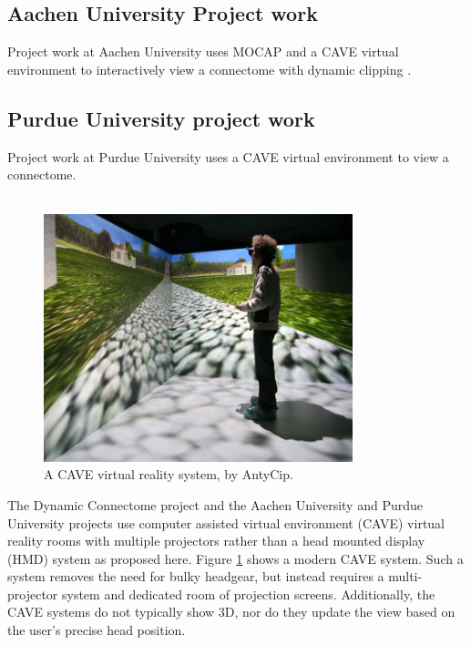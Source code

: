 \documentclass[MSc,paper=a4,pagesize=auto]{icldt}
\begin{document}
\subsection{Aachen University Project work} 
Project work at Aachen University \cite{Rick2011} uses MOCAP and a CAVE virtual environment to interactively view a connectome with dynamic clipping \cite{ceeds2014}.

\subsection{Purdue University project work}
Project work at Purdue University \cite{Chen2011} uses a CAVE virtual environment to view a connectome.
\\
\\
\begin{figure}[htbp!]
    \centering
    \includegraphics[width=0.8\textwidth]{resources/yview_cave}
    \caption{A CAVE virtual reality system, by AntyCip.}
    \label{fig:yview_cave}
\end{figure}

The Dynamic Connectome project and the Aachen University and Purdue University projects use computer assisted virtual environment (CAVE) virtual reality rooms with multiple projectors rather than a head mounted display (HMD) system as proposed here. Figure \ref{fig:yview_cave}	
shows a modern CAVE system. Such a system removes the need for bulky headgear, but instead requires a multi-projector system and dedicated room of projection screens. Additionally, the CAVE systems do not typically show 3D, nor do they update the view based on the user’s precise head position.



\clearpage
\end{document}
